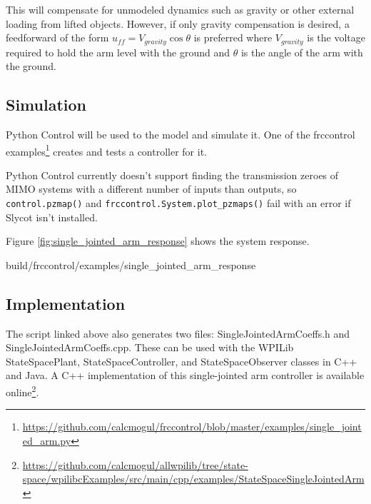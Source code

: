 This will compensate for unmodeled dynamics such as gravity or other external
loading from lifted objects. However, if only gravity compensation is desired,
a feedforward of the form $u_{ff} = V_{gravity} \cos\theta$ is preferred where
$V_{gravity}$ is the voltage required to hold the arm level with the ground and
$\theta$ is the angle of the arm with the ground.

\subsection{Simulation}

Python Control will be used to  the
\gls{model} and simulate it. One of the frccontrol
examples\footnote{\url{https://github.com/calcmogul/frccontrol/blob/master/examples/single_jointed_arm.py}}
creates and tests a controller for it.

\begin{remark}
  Python Control currently doesn't support finding the transmission zeroes of
  MIMO \glspl{system} with a different number of \glspl{input} than
  \glspl{output}, so \texttt{control.pzmap()} and
  \texttt{frccontrol.System.plot\_pzmaps()} fail with an error if Slycot isn't
  installed.
\end{remark}



Figure \ref{fig:single_jointed_arm_response} shows the \gls{system} response.

\begin{svg}{build/frccontrol/examples/single_jointed_arm_response}
  \caption{Single-jointed arm response}
  \label{fig:single_jointed_arm_response}
\end{svg}

\subsection{Implementation}

The script linked above also generates two files: SingleJointedArmCoeffs.h and
SingleJointedArmCoeffs.cpp. These can be used with the WPILib StateSpacePlant,
StateSpaceController, and StateSpaceObserver classes in C++ and Java. A C++
implementation of this single-jointed arm controller is available
online\footnote{\url{https://github.com/calcmogul/allwpilib/tree/state-space/wpilibcExamples/src/main/cpp/examples/StateSpaceSingleJointedArm}}.
